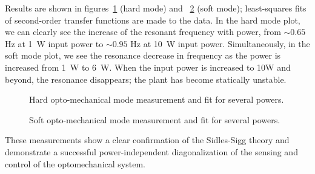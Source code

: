 Results are shown in figures~\ref{fig:hardTF} (hard mode) and
~\ref{fig:softTF} (soft mode); least-squares fits of second-order
transfer functions are made to the data.  In the hard mode plot, we
can clearly see the increase of the resonant frequency with power,
from $\sim0.65$ Hz at 1~W input power to $\sim0.95$ Hz at 10~W input
power.  Simultaneously, in the soft mode plot, we see the resonance
decrease in frequency as the power is increased from 1~W to 6~W.  When
the input power is increased to 10W and beyond, the resonance
disappears; the plant has become statically unstable.

\begin{figure}
\begin{centering}
\caption{Hard opto-mechanical mode measurement and fit for several
 powers.}
\label{fig:hardTF}
\end{centering}
\end{figure}

\begin{figure}
\begin{centering}
\caption{Soft opto-mechanical mode measurement and fit for several
 powers.}
\label{fig:softTF}
\end{centering}
\end{figure}

These measurements show a clear confirmation of the Sidles-Sigg theory
and demonstrate a successful power-independent diagonalization of the
sensing and control of the optomechanical system.









